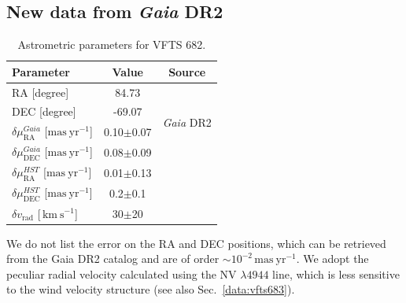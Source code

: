 \documentclass[a4paper,fleqn,usenatbib]{mnras}
\newcommand{\kms}{{\,\mathrm{km\ s^{-1}}}}
\DeclareRobustCommand{\Secref}[1]{Sec.~\ref{#1}}
\begin{document}
\subsection{New data from \emph{Gaia} DR2  \label{data:gaia}}

\begin{table}[t]
  \begin{center}
    \caption{Astrometric parameters for VFTS 682. }
    \begin{tabular}{l|c|c}
      \hline
      \hline
      Parameter & Value & Source\\
      \hline
      RA \hfill[degree] &  \phantom{-}84.73 %
                        & \multirow{4}{*}{\emph{Gaia} DR2}\\[5pt]
      DEC \hfill [degree] & -69.07 %
                        & \\[5pt]
      \cline{1-2}
      $\delta\mu_\mathrm{RA}^{Gaia}$  \hfill[$\mathrm{mas\ yr^{-1}}$] & 0.10$\pm$0.07 & \\[5pt]
      $\delta\mu_\mathrm{DEC}^{Gaia}$  \hfill[$\mathrm{mas\ yr^{-1}}$] & 0.08$\pm$0.09 & \\[5pt]
      \hline
      $\delta\mu_\mathrm{RA}^{HST}$  \hfill[$\mathrm{mas\ yr^{-1}}$] & 0.01$\pm$0.13 & \multirow{2}{*}{\cite{platais:18}}\\[5pt]
      $\delta\mu_\mathrm{DEC}^{HST}$  \hfill[$\mathrm{mas\ yr^{-1}}$] &
                                                                        0.2$\pm$0.1 &
      \\[5pt]
      \hline
      $\delta v_\mathrm{rad}$  \hfill[$\kms$] & 30$\pm$20 & \cite{bestenlehner:11}\\
      \hline
    \end{tabular}
    {We do not list the error on the RA and DEC positions,
      which can be retrieved from the Gaia DR2 catalog and are of order
      $\sim$$10^{-2}\,\mathrm{mas\ yr^{-1}}$. We adopt the peculiar
      radial velocity calculated using the  NV $\lambda4944$ line, which is
      less sensitive to the wind velocity structure (see also \Secref{data:vfts683}).}
  \end{center}
  \label{tab:vfts682}
\end{table}
\end{document}
